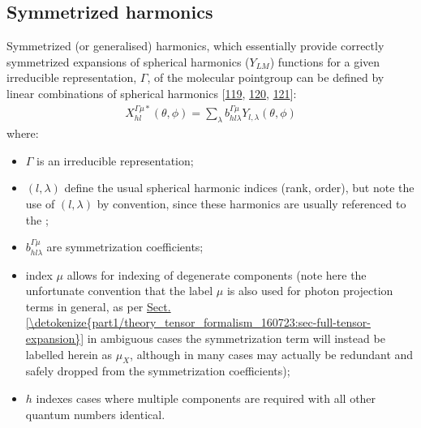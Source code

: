 \documentclass[letterpaper,table,10pt,english]{jupyterBook}
\begin{document}
\subsection{Symmetrized harmonics}
\label{\detokenize{part1/theory_observables_intro_100723:symmetrized-harmonics}}\label{\detokenize{part1/theory_observables_intro_100723:sec-theory-sym-harm-into}}
\sphinxAtStartPar
Symmetrized (or generalised) harmonics, which essentially provide correctly symmetrized expansions of spherical harmonics (\(Y_{LM}\)) functions for a given irreducible representation, \(\Gamma\), of the molecular point\sphinxhyphen{}group can be defined by linear combinations of spherical harmonics {[}\hyperlink{cite.backmatter/bibliography:id508}{119}, \hyperlink{cite.backmatter/bibliography:id509}{120}, \hyperlink{cite.backmatter/bibliography:id555}{121}{]}:
\begin{equation}\label{equation:part1/theory_observables_intro_100723:eq:symHarm-defn}
\begin{split}
X_{hl}^{\Gamma\mu*}(\theta,\phi)=\sum_{\lambda}b_{hl\lambda}^{\Gamma\mu}Y_{l,\lambda}(\theta,\phi)
\end{split}
\end{equation}
\sphinxAtStartPar
where:
\begin{itemize}
\item {} 
\sphinxAtStartPar
\(\Gamma\) is an irreducible representation;

\item {} 
\sphinxAtStartPar
\((l, \lambda)\) define the usual spherical harmonic indices (rank, order), but note the use of \((l, \lambda)\) by convention, since these harmonics are usually referenced to the {\hyperref[\detokenize{backmatter/glossary:term-MF}]{}};

\item {} 
\sphinxAtStartPar
\(b_{hl\lambda}^{\Gamma\mu}\) are symmetrization coefficients;

\item {} 
\sphinxAtStartPar
index \(\mu\) allows for indexing of degenerate components (note here the unfortunate convention that the label \(\mu\) is also used for photon projection terms in general, as per \hyperref[\detokenize{part1/theory_tensor_formalism_160723:sec-full-tensor-expansion}]{Sect.\@ \ref{\detokenize{part1/theory_tensor_formalism_160723:sec-full-tensor-expansion}}} \sphinxhyphen{} in ambiguous cases the symmetrization term will instead be labelled herein as \(\mu_X\), although in many cases may actually be redundant and safely dropped from the symmetrization coefficients);

\item {} 
\sphinxAtStartPar
\(h\) indexes cases where multiple components are required with all other quantum numbers identical.

\end{itemize}
\end{document}
